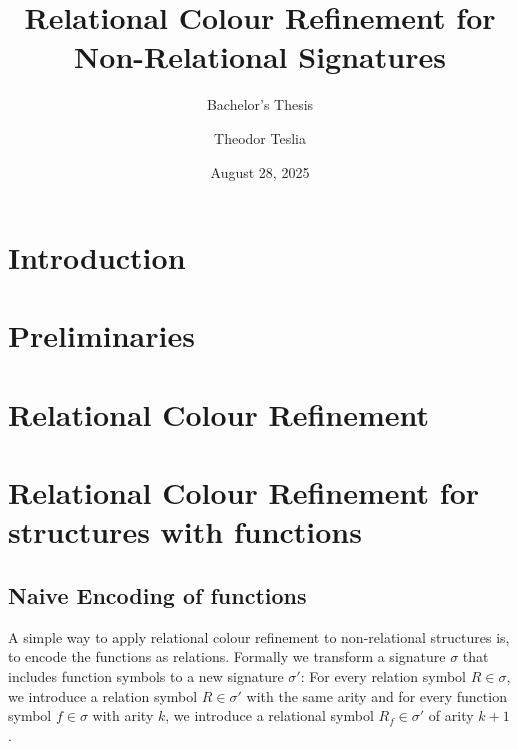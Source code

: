 \documentclass[a4paper,11pt,DIV=15]{scrartcl} %
\theoremstyle{plain}
\theoremstyle{definition}
\begin{document}
\subtitle{Bachelor's Thesis}
\date{August 28, 2025}
\publishers{RWTH Aachen University}	%

\title{Relational Colour Refinement for Non-Relational Signatures}

\author{Theodor Teslia}

\maketitle


\begin{abstract}
\end{abstract}

\thispagestyle{empty}

\clearpage



\section{Introduction}


\section{Preliminaries}

\section{Relational Colour Refinement}


\section{Relational Colour Refinement for structures with functions}

\subsection{Naive Encoding of functions}

A simple way to apply relational colour refinement to non-relational structures is, to encode the functions as relations.
Formally we transform a signature $\sigma$ that includes function symbols to a new signature $\sigma'$: 
For every relation symbol $R\in \sigma$, we introduce a relation symbol $R\in \sigma'$ with the same arity and for every function symbol $f\in\sigma$ with arity $k$, we introduce a relational symbol $R_f\in\sigma'$ of arity $k+1$.
\end{document}
